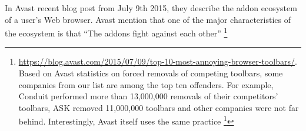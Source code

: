 \documentclass[11pt,oneside]{book}
\begin{document}
{{In Avast recent blog post from July 9th 2015, they describe the addon ecosystem of a user's Web browser. Avast mention that one of the major characteristics of the ecosystem is that ``The addons fight against each other'' \footnote{\url{https://blog.avast.com/2015/07/09/top-10-most-annoying-browser-toolbars/}.
Based on Avast statistics on forced removals of competing toolbars, some companies from our list are among the top ten offenders. For example, Conduit performed more than 13,000,000 removals of their competitors' toolbars, ASK removed 11,000,000 toolbars and other companies were not far behind. Interestingly, Avast itself uses the same practice \footnote{\url{http://techdows.com/2012/11/avast-comes-bundled-with-google-toolbar.html}: ``Avast is contradicting itself. Their latest product offers a built-in feature to rid your browser of toolbars, while offering a toolbar when installing their software.''


}}}}
\end{document}
